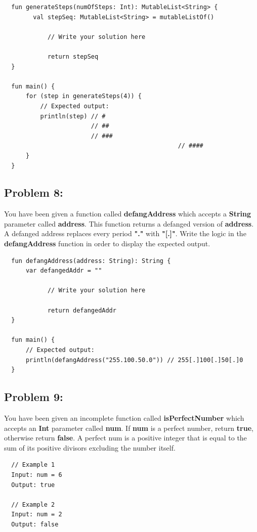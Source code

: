 \documentclass{article}
\begin{document}
\begin{verbatim}
  fun generateSteps(numOfSteps: Int): MutableList<String> {
    	val stepSeq: MutableList<String> = mutableListOf()

			// Write your solution here
      
			return stepSeq  
  }

  fun main() {
      for (step in generateSteps(4)) {
          // Expected output:
          println(step) // #  
                        // ## 
                        // ###
												// ####
      }
  }
\end{verbatim}

\subsection*{Problem 8:}
You have been given a function called \textbf{defangAddress} which accepts a \textbf{String} parameter called \textbf{address}. This function returns a defanged version of \textbf{address}. A defanged address replaces every period \textbf{"."} with \textbf{"[.]"}. Write the logic in the \textbf{defangAddress} function in order to display the expected output.

\begin{verbatim}
  fun defangAddress(address: String): String {
      var defangedAddr = ""
      
			// Write your solution here
      
			return defangedAddr
  }

  fun main() {
      // Expected output:
      println(defangAddress("255.100.50.0")) // 255[.]100[.]50[.]0
  }
\end{verbatim}

\subsection*{Problem 9:}
You have been given an incomplete function called \textbf{isPerfectNumber} which accepts an \textbf{Int} parameter called \textbf{num}. If \textbf{num} is a perfect number, return \textbf{true}, otherwise return \textbf{false}. A perfect num is a positive integer that is equal to the sum of its positive divisors excluding the number itself.

\begin{verbatim}
  // Example 1
  Input: num = 6
  Output: true

  // Example 2
  Input: num = 2
  Output: false
\end{verbatim}
\end{document}
